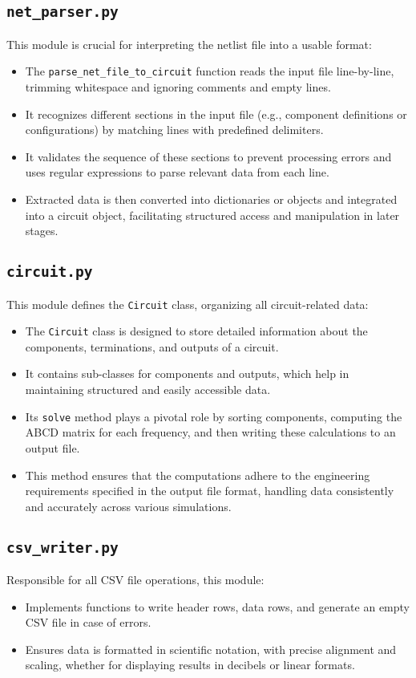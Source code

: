\documentclass[conference]{IEEEtran}
\begin{document}
\subsection{\textbf{\texttt{net\_parser.py}}}
This module is crucial for interpreting the netlist file into a usable format:
\begin{itemize}
  \item The \texttt{parse\_net\_file\_to\_circuit} function reads the input file line-by-line, trimming whitespace and ignoring comments and empty lines.
  \item It recognizes different sections in the input file (e.g., component definitions or configurations) by matching lines with predefined delimiters.
  \item It validates the sequence of these sections to prevent processing errors and uses regular expressions to parse relevant data from each line.
  \item Extracted data is then converted into dictionaries or objects and integrated into a circuit object, facilitating structured access and manipulation in later stages.
\end{itemize}

\subsection{\textbf{\texttt{circuit.py}}}
This module defines the \texttt{Circuit} class, organizing all circuit-related data:
\begin{itemize}
  \item The \texttt{Circuit} class is designed to store detailed information about the components, terminations, and outputs of a circuit.
  \item It contains sub-classes for components and outputs, which help in maintaining structured and easily accessible data.
  \item Its \texttt{solve} method plays a pivotal role by sorting components, computing the ABCD matrix for each frequency, and then writing these calculations to an output file.
  \item This method ensures that the computations adhere to the engineering requirements specified in the output file format, handling data consistently and accurately across various simulations.
\end{itemize}

\subsection{\textbf{\texttt{csv\_writer.py}}}
Responsible for all CSV file operations, this module:
\begin{itemize}
  \item Implements functions to write header rows, data rows, and generate an empty CSV file in case of errors.
  \item Ensures data is formatted in scientific notation, with precise alignment and scaling, whether for displaying results in decibels or linear formats.
\end{itemize}
\end{document}
